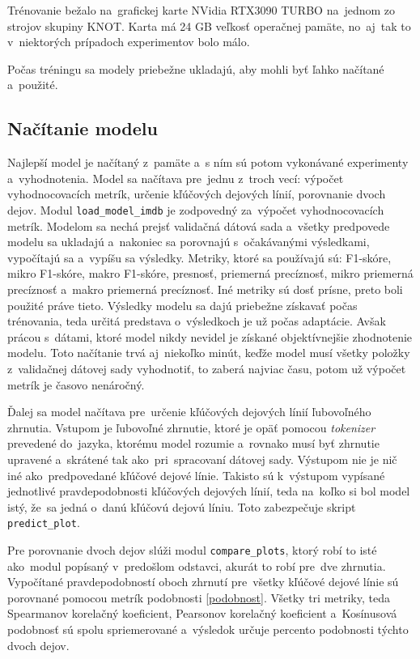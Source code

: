 Trénovanie bežalo na~grafickej karte NVidia RTX3090 TURBO na~jednom zo strojov skupiny KNOT. Karta má 24 GB veľkosť operačnej pamäte, no~aj~tak to v~niektorých prípadoch experimentov bolo málo. 

Počas tréningu sa modely priebežne ukladajú, aby mohli byť ľahko načítané a~použité.

\subsection*{Načítanie modelu}

Najlepší model je načítaný z~pamäte a~s ním sú potom vykonávané experimenty a~vyhodnotenia. Model sa načítava pre~jednu z~troch vecí: výpočet vyhodnocovacích metrík, určenie kľúčových dejových línií, porovnanie dvoch dejov. Modul {\tt load\_model\_imdb} je zodpovedný za~výpočet vyhodnocovacích metrík. Modelom sa nechá prejsť validačná dátová sada  a~všetky predpovede modelu sa ukladajú a~nakoniec sa porovnajú s~očakávanými výsledkami, vypočítajú sa a~vypíšu sa výsledky. Metriky, ktoré sa používajú sú: F1-skóre, mikro F1-skóre, makro F1-skóre, presnosť, priemerná precíznosť, mikro priemerná precíznosť a~makro priemerná precíznosť. Iné metriky sú dosť prísne, preto boli použité práve tieto. Výsledky modelu sa dajú priebežne získavať počas trénovania, teda určitá predstava o~výsledkoch je už počas adaptácie. Avšak prácou s~dátami, ktoré model nikdy nevidel je získané objektívnejšie zhodnotenie modelu. Toto načítanie trvá aj~niekoľko minút, keďže model musí všetky položky z~validačnej dátovej sady vyhodnotiť, to zaberá najviac času, potom už výpočet metrík je časovo nenáročný. 

Ďalej sa model načítava pre~určenie kľúčových dejových línií ľubovoľného zhrnutia. Vstupom je ľubovoľné zhrnutie, ktoré je opäť pomocou \textit{tokenizer} prevedené do~jazyka, ktorému model rozumie a~rovnako musí byť zhrnutie upravené a~skrátené tak ako~pri~spracovaní dátovej sady. Výstupom nie je nič iné ako~predpovedané kľúčové dejové línie. Takisto sú k~výstupom vypísané jednotlivé pravdepodobnosti kľúčových dejových línií, teda na~koľko si bol model istý, že~sa jedná o~danú kľúčovú dejovú líniu. Toto zabezpečuje skript {\tt predict\_plot}.

Pre porovnanie dvoch dejov slúži modul {\tt compare\_plots}, ktorý robí to isté ako~modul popísaný v~predošlom odstavci, akurát to robí pre~dve zhrnutia. Vypočítané pravdepodobností oboch zhrnutí pre~všetky kľúčové dejové línie sú porovnané pomocou metrík podobnosti \ref{podobnost}. Všetky tri metriky, teda Spearmanov korelačný koeficient, Pearsonov korelačný koeficient a~Kosínusová podobnosť sú spolu spriemerované a~výsledok určuje percento podobnosti týchto dvoch dejov.


